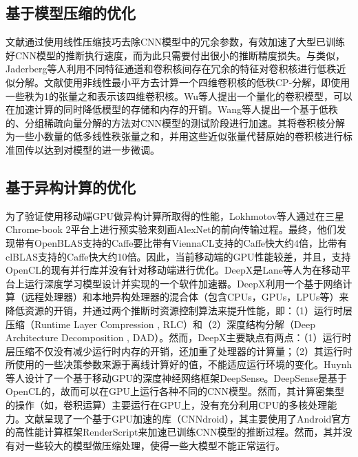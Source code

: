 \subsection{基于模型压缩的优化}
文献\cite{denton2014exploiting}通过使用线性压缩技巧去除CNN模型中的冗余参数，有效加速了大型已训练好CNN模型的推断执行速度，而为此只需要付出很小的推断精度损失。与\cite{denton2014exploiting}类似，Jaderberg等人\cite{jaderberg2014speeding}利用不同特征通道和卷积核间存在冗余的特征对卷积核进行低秩近似分解。文献\cite{lebedev2014speeding}使用非线性最小平方去计算一个四维卷积核的低秩CP-分解，即使用一些秩为1的张量之和表示该四维卷积核。Wu等人\cite{wu2016quantized}提出一个量化的卷积模型，可以在加速计算的同时降低模型的存储和内存的开销。Wang等人\cite{wang2016accelerating}提出一个基于低秩的、分组稀疏向量分解的方法对CNN模型的测试阶段进行加速。其将卷积核分解为一些小数量的低多线性秩张量之和，并用这些近似张量代替原始的卷积核进行标准回传以达到对模型的进一步微调。
\subsection{基于异构计算的优化}
为了验证使用移动端GPU做异构计算所取得的性能，Lokhmotov等人\cite{lokhmotov2016optimizing}通过在三星 Chrome-book 2平台上进行预实验来刻画AlexNet的前向传输过程。最终，他们发现带有OpenBLAS支持的Caffe\cite{jia2014caffe}要比带有ViennaCL支持的Caffe快大约4倍，比带有clBLAS支持的Caffe快大约10倍。因此，当前移动端的GPU性能较差，并且，支持OpenCL的现有并行库并没有针对移动端进行优化。DeepX是Lane等人\cite{lane2016deepx}为在移动平台上运行深度学习模型设计并实现的一个软件加速器。DeepX利用一个基于网络计算（远程处理器）和本地异构处理器的混合体（包含CPUs，GPUs，LPUs等）来降低资源的开销，并通过两个推断时资源控制算法来提升性能，即：（1）运行时层压缩（Runtime Layer Compression , RLC）和（2）深度结构分解（Deep Architecture Decomposition , DAD）。然而，DeepX主要缺点有两点：（1）运行时层压缩不仅没有减少运行时内存的开销，还加重了处理器的计算量；（2）其运行时所使用的一些决策参数来源于离线计算好的值，不能适应运行环境的变化。Huynh等人\cite{huynh2016deepsense}设计了一个基于移动GPU的深度神经网络框架DeepSense。DeepSense是基于OpenCL的，故而可以在GPU上运行各种不同的CNN模型。然而，其计算密集型的操作（如，卷积运算）主要运行在GPU上，没有充分利用CPU的多核处理能力。文献\cite{latifi2016cnndroid}呈现了一个基于GPU加速的库（CNNdroid），其主要使用了Android官方的高性能计算框架RenderScript来加速已训练CNN模型的推断过程。然而，其并没有对一些较大的模型做压缩处理，使得一些大模型不能正常运行。

